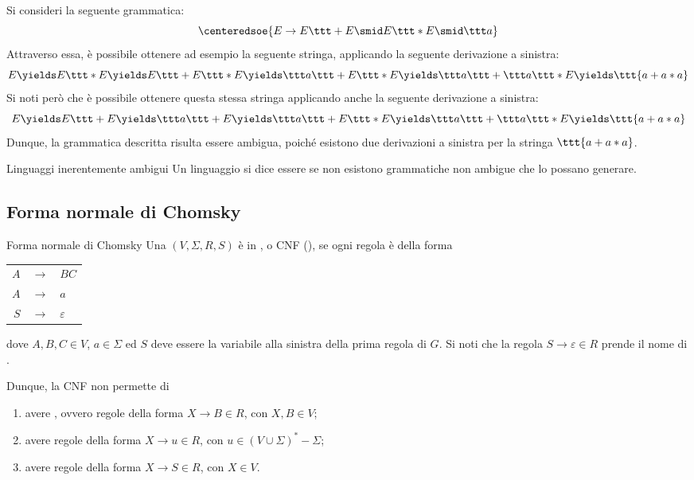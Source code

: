 \documentclass[a4paper, 12pt]{report}
\begin{document}
    \begin{example}
        Si consideri la seguente grammatica: $$\centeredsoe{E \to E \ttt + E \smid E \ttt * E \smid \ttt a}$$ Attraverso essa, è possibile ottenere ad esempio la seguente stringa, applicando la seguente derivazione a sinistra: $$E \yields E \ttt * E \yields E \ttt + E \ttt * E \yields \ttt a \ttt + E \ttt * E \yields \ttt a \ttt + \ttt a \ttt * E \yields \ttt{a+a*a}$$ Si noti però che è possibile ottenere questa stessa stringa applicando anche la seguente derivazione a sinistra: $$E \yields E \ttt + E \yields \ttt a \ttt + E \yields \ttt a \ttt + E \ttt * E \yields \ttt a \ttt + \ttt a \ttt * E \yields \ttt{a+a*a}$$ Dunque, la grammatica descritta risulta essere ambigua, poiché esistono due derivazioni a sinistra per la stringa $\ttt{a+a*a}$.
    \end{example}

    \begin{frameddefn}{Linguaggi inerentemente ambigui}
        Un linguaggio si dice essere  se non esistono grammatiche non ambigue che lo possano generare.
    \end{frameddefn}

    \subsection{Forma normale di Chomsky}

    \begin{frameddefn}{Forma normale di Chomsky}
        Una \CFG $(V, \Sigma, R, S)$ è in , o CNF (), se ogni regola è della forma

        \begin{center}
            \begin{tabular}{rcl}
                $A$ & $\to$ & $BC$ \\ 
                $A$ & $\to$ & $a$ \\
                $S$ & $\to$ & $\varepsilon$
            \end{tabular}
        \end{center}

        dove $A, B, C \in V$, $a \in \Sigma$ ed $S$ deve essere la variabile alla sinistra della prima regola di $G$. Si noti che la regola $S \to \varepsilon \in R$ prende il nome di .

        Dunque, la CNF non permette di

        \begin{enumerate}[label=\roman*), font=\itshape]
            \item avere , ovvero regole della forma $X \to B \in R$, con $X,B \in V$;
            \item avere regole della forma $X \to u \in R$, con $u \in (V \cup \Sigma)^* - \Sigma$;
            \item avere regole della forma $X \to S \in R$, con $X \in V$.
        \end{enumerate}
    \end{frameddefn}
\end{document}

